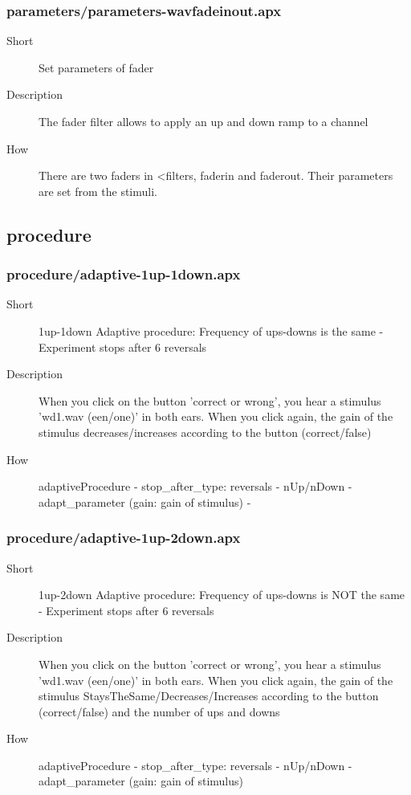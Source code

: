 \subsubsection{parameters/parameters-wavfadeinout.apx}
\begin{description}
\item[Short] 
 Set parameters of fader
\item[Description] 
 The fader filter allows to apply an up and down ramp to a channel
\item[How] 
 There are two faders in \textless{}filters, faderin and faderout. Their parameters are set from the stimuli.
\end{description}

\subsection{procedure}
\subsubsection{procedure/adaptive-1up-1down.apx}
\begin{description}
\item[Short] 
 1up-1down Adaptive procedure: Frequency of ups-downs is the same - Experiment stops after 6 reversals
\item[Description] 
 When you click on the button 'correct or wrong', you hear a stimulus 'wd1.wav (een/one)' in both ears. When you click again, the gain of the stimulus decreases/increases according to the button (correct/false)
\item[How] 
 adaptiveProcedure - stop\_after\_type: reversals - nUp/nDown - adapt\_parameter (gain: gain of stimulus) -
\end{description}

\subsubsection{procedure/adaptive-1up-2down.apx}
\begin{description}
\item[Short] 
 1up-2down Adaptive procedure: Frequency of ups-downs is NOT the same - Experiment stops after 6 reversals
\item[Description] 
 When you click on the button 'correct or wrong', you hear a stimulus 'wd1.wav (een/one)' in both ears. When you click again, the gain of the stimulus StaysTheSame/Decreases/Increases according to the button (correct/false) and the number of ups and downs
\item[How] 
 adaptiveProcedure - stop\_after\_type: reversals - nUp/nDown - adapt\_parameter (gain: gain of stimulus)
\end{description}

